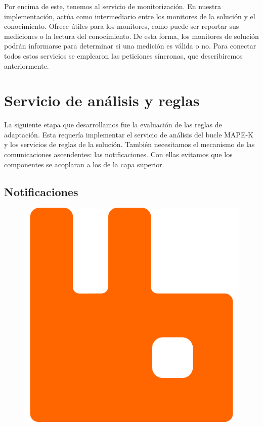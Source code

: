Por encima de este, tenemos al servicio de monitorización. En nuestra implementación, actúa como intermediario entre los monitores de la solución y el conocimiento. Ofrece  útiles para los monitores, como puede ser reportar sus mediciones o la lectura del conocimiento. De esta forma, los monitores de solución podrán informarse para determinar si una medición es válida o no. Para conectar todos estos servicios se emplearon las peticiones síncronas, que describiremos anteriormente.

\section{Servicio de análisis y reglas}
\label{sec:implementacion-modulo-reglas}

La siguiente etapa que desarrollamos fue la evaluación de las reglas de adaptación. Esta requería implementar el servicio de análisis del bucle MAPE-K y los servicios de reglas de la solución. También necesitamos el mecanismo de las comunicaciones ascendentes: las notificaciones. Con ellas evitamos que los componentes se acoplaran a los de la capa superior.

\subsection{Notificaciones}

\begin{figure}
  \vspace{-10pt}
  \includegraphics[scale=0.09]{cap_implementacion/images/rabbitmq}
  \centering
  \vspace{-10pt}
\end{figure}

